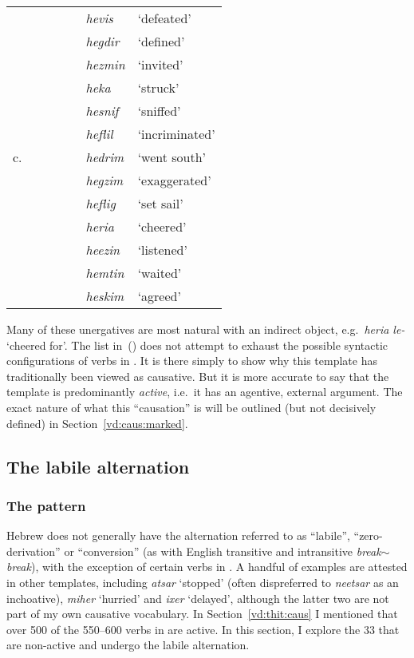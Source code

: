 \begin{tabular}{l|ll|ll|ll}
	& &&&& \emph{hevis} & `defeated'\\
	& &&&& \emph{hegdir} & `defined'\\
	& &&&& \emph{hezmin} & `invited'\\
	& &&&& \emph{heka} & `struck'\\
	& &&&& \emph{hesnif} & `sniffed'\\
	& &&&& \emph{heflil} & `incriminated'\\
	\hline
	c.	& &&&&  \emph{hedrim} & `went south' \\
		& &&&&  \emph{hegzim} & `exaggerated' \\
		& &&&&  \emph{heflig} & `set sail' \\
		& &&&&  \emph{heria} & `cheered' \\
		& &&&& \emph{heezin} & `listened'\\
		& &&&& \emph{hemtin} & `waited'\\
		& &&&& \emph{heskim} & `agreed'\\
	\end{tabular}
\xe

Many of these unergatives are most natural with an indirect object, e.g.~\emph{heria le-} `cheered for'. The list in~(\lastx) does not attempt to exhaust the possible syntactic configurations of verbs in {\thif}. It is there simply to show why this template has traditionally been viewed as causative. But it is more accurate to say that the template is predominantly \emph{active}, i.e.~it has an agentive, external argument. The exact nature of what this ``causation'' is will be outlined (but not decisively defined) in Section~\ref{vd:caus:marked}.


	\subsection{The labile alternation} \label{vd:thif:inch}
		\subsubsection{The pattern}
Hebrew does not generally have the alternation referred to as ``labile'', ``zero-derivation'' or ``conversion'' (as with English transitive and intransitive \emph{break}$\sim$\emph{break}), with the exception of certain verbs in {\thif}. A handful of examples are attested in other templates, including \emph{a{ts}ar} `stopped' (often dispreferred to \emph{nee{ts}ar} as an inchoative), \emph{miher} `hurried' and \emph{ixer} `delayed', although the latter two are not part of my own causative vocabulary. In Section~\ref{vd:thit:caus} I mentioned that over 500 of the 550--600 verbs in {\thif} are active. In this section, I explore the 33 that are non-active and undergo the labile alternation.

